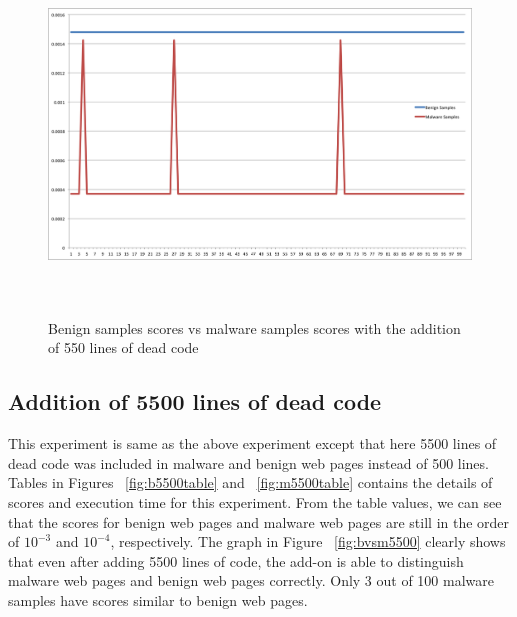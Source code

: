 \begin{figure}[h]
    \centering
    \includegraphics[width=16cm, height=9.53cm]{500.png}
    \caption[Benign Samples vs Malware Samples]{Benign samples scores vs malware samples scores with the addition of 550 lines of dead code}
    \label{fig:bvsm500}
\end{figure}


\subsection{Addition of 5500 lines of dead code}
This experiment is same as the above experiment except that here 5500 lines of dead code was included in malware and benign web pages instead of 500 lines. Tables in Figures ~\ref{fig:b5500table} and  ~\ref{fig:m5500table} contains the details of scores and execution time for this experiment. From the table values, we can see that the scores for benign web pages and malware web pages are still in the order of $10^{-3}$ and $10^{-4}$, respectively. The graph in Figure ~\ref{fig:bvsm5500} clearly shows that even after adding 5500 lines of code, the add-on is able to distinguish malware web pages and benign web pages correctly. Only 3 out of 100 malware samples have scores similar to benign web pages.

